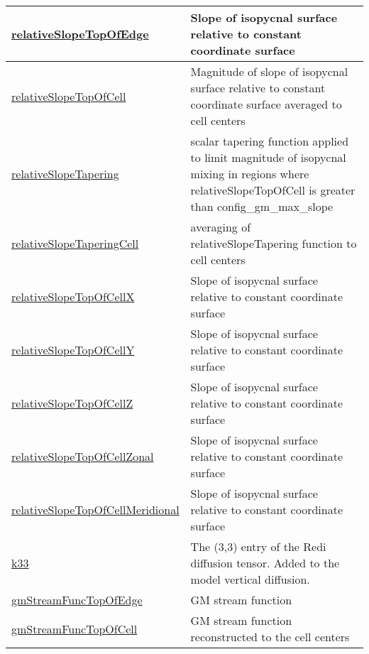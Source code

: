 {\begin{center}
\begin{longtable}{| p{2.0in} | p{4.0in} |}
    \hline
    \hyperref[subsec:var_sec_diagnostics_relativeSlopeTopOfEdge]{relativeSlopeTopOfEdge} & Slope of isopycnal surface relative to constant coordinate surface \\
    \hline
    \hyperref[subsec:var_sec_diagnostics_relativeSlopeTopOfCell]{relativeSlopeTopOfCell} & Magnitude of slope of isopycnal surface relative to constant coordinate surface averaged to cell centers \\
    \hline
    \hyperref[subsec:var_sec_diagnostics_relativeSlopeTapering]{relativeSlopeTapering} & scalar tapering function applied to limit magnitude of isopycnal mixing in regions where relativeSlopeTopOfCell is greater than config\_gm\_max\_slope \\
    \hline
    \hyperref[subsec:var_sec_diagnostics_relativeSlopeTaperingCell]{relativeSlopeTaperingCell} & averaging of relativeSlopeTapering function to cell centers \\
    \hline
    \hyperref[subsec:var_sec_diagnostics_relativeSlopeTopOfCellX]{relativeSlopeTopOfCellX} & Slope of isopycnal surface relative to constant coordinate surface \\
    \hline
    \hyperref[subsec:var_sec_diagnostics_relativeSlopeTopOfCellY]{relativeSlopeTopOfCellY} & Slope of isopycnal surface relative to constant coordinate surface \\
    \hline
    \hyperref[subsec:var_sec_diagnostics_relativeSlopeTopOfCellZ]{relativeSlopeTopOfCellZ} & Slope of isopycnal surface relative to constant coordinate surface \\
    \hline
    \hyperref[subsec:var_sec_diagnostics_relativeSlopeTopOfCellZonal]{relativeSlopeTopOfCellZonal} & Slope of isopycnal surface relative to constant coordinate surface \\
    \hline
    \hyperref[subsec:var_sec_diagnostics_relativeSlopeTopOfCellMeridional]{relativeSlopeTopOfCellMeridional} & Slope of isopycnal surface relative to constant coordinate surface \\
    \hline
    \hyperref[subsec:var_sec_diagnostics_k33]{k33} & The (3,3) entry of the Redi diffusion tensor. Added to the model vertical diffusion. \\
    \hline
    \hyperref[subsec:var_sec_diagnostics_gmStreamFuncTopOfEdge]{gmStreamFuncTopOfEdge} & GM stream function \\
    \hline
    \hyperref[subsec:var_sec_diagnostics_gmStreamFuncTopOfCell]{gmStreamFuncTopOfCell} & GM stream function reconstructed to the cell centers \\

\end{longtable}
\end{center}}
